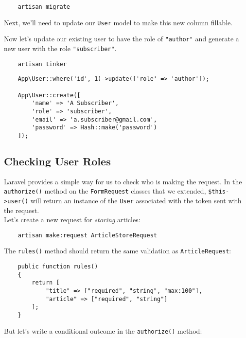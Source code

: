 \begin{verbatim}
    artisan migrate
\end{verbatim}

Next, we'll need to update our \texttt{User} model to make this new column fillable.


Now let's update our existing user to have the role of \texttt{"author"} and generate a new user with the role \texttt{"subscriber"}.

\begin{verbatim}
    artisan tinker
\end{verbatim}

\begin{verbatim}
    App\User::where('id', 1)->update(['role' => 'author']);

    App\User::create([
        'name' => 'A Subscriber',
        'role' => 'subscriber',
        'email' => 'a.subscriber@gmail.com',
        'password' => Hash::make('password')
    ]);
\end{verbatim}


\subsection{Checking User Roles}

Laravel provides a simple way for us to check who is making the request. In the \texttt{authorize()} method on the \texttt{FormRequest} classes that we extended, \texttt{\$this->user()} will return an instance of the \texttt{User} associated with the token sent with the request.
\\

Let's create a new request for \textit{storing} articles:

\begin{verbatim}
    artisan make:request ArticleStoreRequest
\end{verbatim}

The \texttt{rules()} method should return the same validation as \texttt{ArticleRequest}:

\begin{verbatim}
    public function rules()
    {
        return [
            "title" => ["required", "string", "max:100"],
            "article" => ["required", "string"]
        ];
    }
\end{verbatim}

But let's write a conditional outcome in the \texttt{authorize()} method:

